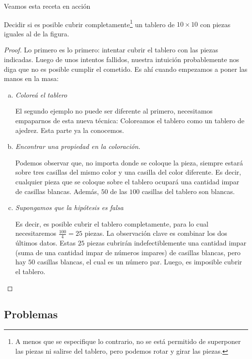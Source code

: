 Veamos esta receta en acci\'on

\begin{ejem} \label{ejemplotetramino}
	Decidir si es posible cubrir completamente\footnote{A menos  que se especifique lo contrario, no se est\'a permitido de superponer las piezas ni salirse del tablero, pero podemos rotar y girar las piezas.} un tablero de $10 \times 10 $ con piezas iguales al de la figura.
\end{ejem}
\begin{proof}
	Lo primero es lo primero: intentar cubrir el tablero con las piezas indicadas. Luego de unos intentos fallidos, nuestra intuici\'on probablemente nos diga que no es posible cumplir el cometido. Es ah\'i cuando empezamos a poner las manos en la masa:
	
	\begin{enumerate}[a.]
		
		\item \textit{Colore\'a el tablero}
		
		El segundo ejemplo no puede ser diferente al primero, necesitamos empaparnos de esta nueva t\'ecnica: Coloreamos el tablero como un tablero de ajedrez. Esta parte ya la conocemos.
		
		\item \textit{Encontrar una propiedad en la coloraci\'on.}
		
		Podemos observar que, no importa donde se coloque la pieza, siempre estar\'a sobre tres casillas del mismo color y una casilla del color diferente. Es decir, cualquier pieza que se coloque sobre el tablero ocupar\'a una cantidad impar de casillas blancas. Adem\'as, $50$ de las $100$ casillas del tablero son blancas.
		
		\item \textit{Supongamos que la hip\'otesis es falsa}
		
		Es decir, es posible cubrir el tablero completamente, para lo cual necesitaremos $\frac{100}{4} = 25$ piezas. La observaci\'on clave es combinar los dos \'ultimos datos. Estas $25$ piezas cubrir\'an indefectiblemente una cantidad impar (suma de una cantidad impar de n\'umeros impares) de casillas blancas, pero hay $50$ casillas blancas, el cual es un n\'umero par. Luego, es imposible cubrir el tablero.
	\end{enumerate}
\end{proof}

\subsection{Problemas}

